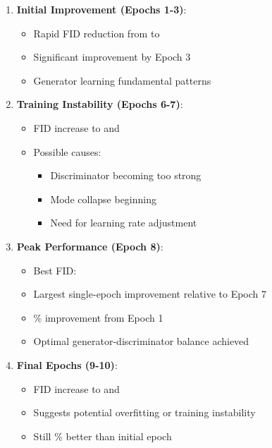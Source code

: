 \documentclass[conference,12pt]{IEEEtran}
\begin{document}
\begin{enumerate}
    \item \textbf{Initial Improvement (Epochs 1-3)}:
    \begin{itemize}
        \item Rapid FID reduction from \FIDEpochOne{} to \FIDEpochThree
        \item Significant improvement by Epoch 3
        \item Generator learning fundamental patterns
    \end{itemize}
    
    \item \textbf{Training Instability (Epochs 6-7)}:
    \begin{itemize}
        \item FID increase to \FIDEpochSix{} and \FIDEpochSeven
        \item Possible causes:
        \begin{itemize}
            \item Discriminator becoming too strong
            \item Mode collapse beginning
            \item Need for learning rate adjustment
        \end{itemize}
    \end{itemize}
    
    \item \textbf{Peak Performance (Epoch 8)}:
    \begin{itemize}
        \item Best FID: \BestFID
        \item Largest single-epoch improvement relative to Epoch 7
        \item \BestFIDImprovePct\% improvement from Epoch 1
        \item Optimal generator-discriminator balance achieved
    \end{itemize}
    
    \item \textbf{Final Epochs (9-10)}:
    \begin{itemize}
        \item FID increase to \FIDEpochNine{} and \FIDEpochTen
        \item Suggests potential overfitting or training instability
        \item Still \FinalFIDImprovePct\% better than initial epoch
    \end{itemize}
\end{enumerate}
\end{document}
